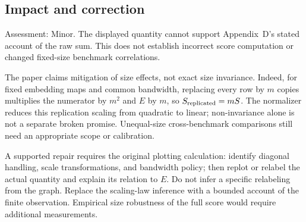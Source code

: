 \documentclass[10pt]{article}
\begin{document}
\subsection*{Impact and correction}
Assessment: Minor. The displayed quantity cannot support Appendix D’s stated account of the raw sum. This does not establish incorrect score computation or changed fixed-size benchmark correlations.\par
The paper claims mitigation of size effects, not exact size invariance. Indeed, for fixed embedding maps and common bandwidth, replacing every row by \(m\) copies multiplies the numerator by \(m^2\) and \(E\) by \(m\), so \(S_{\rm replicated}=mS\). The normalizer reduces this replication scaling from quadratic to linear; non-invariance alone is not a separate broken promise. Unequal-size cross-benchmark comparisons still need an appropriate scope or calibration.\par
A supported repair requires the original plotting calculation: identify diagonal handling, scale transformations, and bandwidth policy; then replot or relabel the actual quantity and explain its relation to \(E\). Do not infer a specific relabeling from the graph. Replace the scaling-law inference with a bounded account of the finite observation. Empirical size robustness of the full score would require additional measurements.\par
\end{document}
